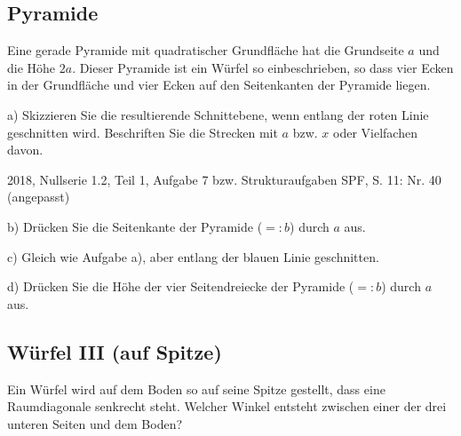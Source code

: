 \subsection{Pyramide}
Eine gerade Pyramide mit quadratischer Grundfläche hat die
Grundseite $a$ und die Höhe $2a$. Dieser Pyramide ist ein Würfel
so einbeschrieben, so dass vier Ecken in der Grundfläche und
vier Ecken auf den Seitenkanten der Pyramide liegen.

a) Skizzieren Sie die resultierende Schnittebene, wenn entlang der
roten Linie geschnitten wird. Beschriften Sie die Strecken mit $a$ bzw.
$x$ oder Vielfachen davon.

{\tiny{2018, Nullserie 1.2, Teil 1, Aufgabe 7 bzw. Strukturaufgaben SPF, S. 11: Nr. 40 (angepasst)}}



b) Drücken Sie die Seitenkante der Pyramide ($=:b$) durch $a$ aus.



c) Gleich wie Aufgabe a), aber entlang der blauen Linie geschnitten.



d) Drücken Sie die Höhe der vier Seitendreiecke der Pyramide ($=:b$) durch $a$ aus.

\subsection{Würfel III (auf Spitze)}
Ein Würfel wird auf dem Boden so auf seine Spitze gestellt, dass eine Raumdiagonale senkrecht steht.
Welcher Winkel entsteht zwischen einer der drei unteren Seiten und dem Boden?


